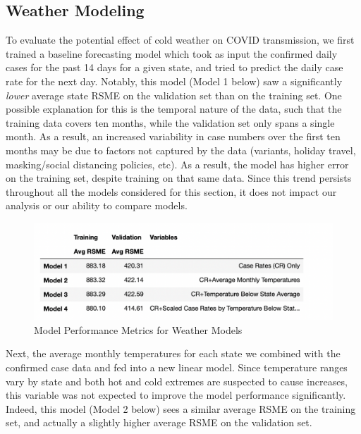 \documentclass[11pt]{article}
\begin{document}
 


\subsection{Weather Modeling}

To evaluate the potential effect of cold weather on COVID transmission, we first trained a baseline forecasting model which took as input the confirmed daily cases for the past 14 days for a given state, and tried to predict the daily case rate for the next day. Notably, this model (Model 1 below) saw a significantly \textit{lower} average state RSME on the validation set than on the training set. One possible explanation for this is the temporal nature of the data, such that the training data covers ten months, while the validation set only spans a single month. As a result, an increased variability in case numbers over the first ten months may be due to factors not captured by the data (variants, holiday travel, masking/social distancing policies, etc). As a result, the model has higher error on the training set, despite training on that same data. Since this trend persists throughout all the models considered for this section, it does not impact our analysis or our ability to compare models.

\begin{figure}[h]
\centering
\includegraphics[scale=0.75]{"../figures/weather_model_report.png"}
\caption{Model Performance Metrics for Weather Models}
\end{figure}

Next, the average monthly temperatures for each state we combined with the confirmed case data and fed into a new linear model. Since temperature ranges vary by state and both hot and cold extremes are suspected to cause increases, this variable was not expected to improve the model performance significantly. Indeed, this model (Model 2 below) sees a similar average RSME on the training set, and actually a slightly higher average RSME on the validation set. 
\end{document}
